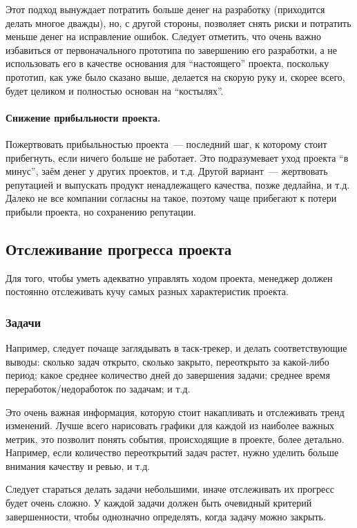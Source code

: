 \documentclass{../../text-style}
\begin{document}
Этот подход вынуждает потратить больше денег на разработку (приходится делать многое дважды), но, с другой стороны, позволяет снять риски и потратить меньше денег на исправление ошибок. Следует отметить, что очень важно избавиться от первоначального прототипа по завершению его разработки, а не использовать его в качестве основания для \enquote{настоящего} проекта, поскольку прототип, как уже было сказано выше, делается на скорую руку и, скорее всего, будет целиком и полностью основан на \enquote{костылях}.

\paragraph{Снижение прибыльности проекта.} Пожертвовать прибыльностью проекта~--- последний шаг, к которому стоит прибегнуть, если ничего больше не работает. Это подразумевает уход проекта \enquote{в минус}, заём денег у других проектов, и т.д. Другой вариант~--- жертвовать репутацией и выпускать продукт ненадлежащего качества, позже дедлайна, и т.д. Далеко не все компании согласны на такое, поэтому чаще прибегают к потери прибыли проекта, но сохранению репутации.

\subsection{Отслеживание прогресса проекта}

Для того, чтобы уметь адекватно управлять ходом проекта, менеджер должен постоянно отслеживать кучу самых разных характеристик проекта.

\subsubsection{Задачи}

Например, следует почаще заглядывать в таск-трекер, и делать соответствующие выводы: сколько задач открыто, сколько закрыто, переоткрыто за какой-либо период; какое среднее количество дней до завершения задачи; среднее время переработок/недоработок по задачам; и т.д.

Это очень важная информация, которую стоит накапливать и отслеживать тренд изменений. Лучше всего нарисовать графики для каждой из наиболее важных метрик, это позволит понять события, происходящие в проекте, более детально. Например, если количество переоткрытий задач растет, нужно уделить больше внимания качеству и ревью, и т.д. 

Следует стараться делать задачи небольшими, иначе отслеживать их прогресс будет очень сложно. У каждой задачи должен быть очевидный критерий завершенности, чтобы однозначно определять, когда задачу можно закрыть.
\end{document}
